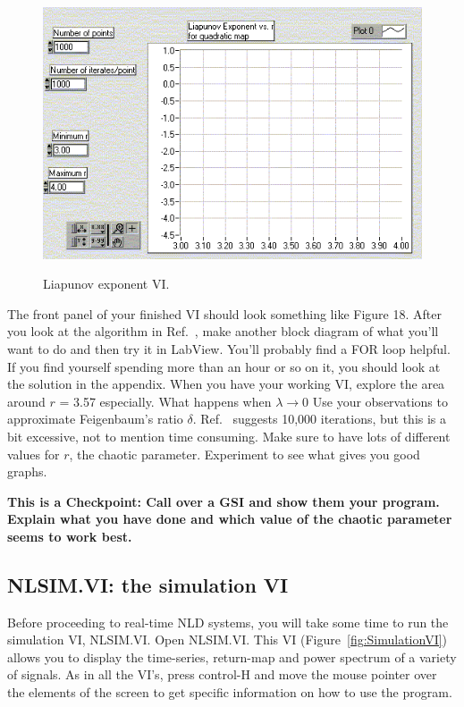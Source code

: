 \documentclass{../lab}
\begin{document}
\begin{figure}[h]
    \centering
    \href{http://experimentationlab.berkeley.edu/sites/default/files/images/Nldimage107.gif}{\includegraphics[width=0.5\linewidth]{images/Nldimage107.png}}
    \caption{Liapunov exponent VI.}
    \label{fig:Nldimage107}
\end{figure}

The front panel of your finished VI should look something like Figure 18. After you look at the algorithm in Ref.~\cite{Strogatz}, make another block diagram of what you'll want to do and then try it in LabView. You'll probably find a FOR loop helpful. If you find yourself spending more than an hour or so on it, you should look at the solution in the appendix. When you have your working VI, explore the area around $r$ = 3.57 especially. What happens when $\lambda \rightarrow 0$ Use your observations to approximate Feigenbaum's ratio $\delta$. Ref.~\cite{Strogatz} suggests 10,000 iterations, but this is a bit excessive, not to mention time consuming. Make sure to have lots of different values for $r$, the chaotic parameter. Experiment to see what gives you good graphs.

\textbf{This is a Checkpoint: Call over a GSI and show them your program. Explain what you have done and which value of the chaotic parameter seems to work best.}

\subsection{NLSIM.VI: the simulation VI}

Before proceeding to real-time NLD systems, you will take some time to run the simulation VI, NLSIM.VI. Open NLSIM.VI. This VI (Figure~\ref{fig:SimulationVI}) allows you to display the time-series, return-map and power spectrum of a variety of signals. As in all the VI's, press control-H and move the mouse pointer over the elements of the screen to get specific information on how to use the program.
\end{document}
